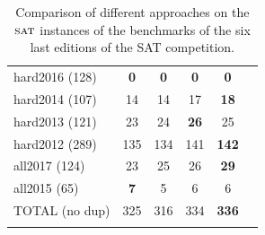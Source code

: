 \begin{table}[!htbp]
{{\begin{tabular}{l|ccccc}
    hard2016 (128) & \cellcolor{gray!30}\textbf{0} & \cellcolor{gray!30}\textbf{0} & \cellcolor{gray!30}\textbf{0} & \cellcolor{gray!30}\textbf{0}\\
    hard2014 (107) & 14 & 14 & 17 & \cellcolor{gray!30}\textbf{18}\\
    hard2013 (121) & 23 & 24 & \cellcolor{gray!30}\textbf{26} & 25\\
    hard2012 (289) & 135 & 134 & 141 & \cellcolor{gray!30}\textbf{142}\\
    \hline
    all2017 (124) & 23 & 25 & 26 & \cellcolor{gray!30}\textbf{29}\\
    all2015 (65) & \cellcolor{gray!30}\textbf{7} & 5 & 6 & 6\\
    \hline
    TOTAL (no dup) & 325 & 316 & 334 & \cellcolor{gray!30}\textbf{336}\\
    \label{table:sat:bliss}
   \end{tabular}
  }
 }
 \vspace*{0.1cm}
 \caption{Comparison of different approaches on the $\textsc{sat}$ instances of the benchmarks of the six last editions of the SAT competition.}
 \label{table:benchSAT}
\end{table}
\begin{table}[!htbp]
 \centering\footnotesize
 \hspace{1em}
 \vspace*{0.1cm}
 \caption{Comparison of PAR-2 times (in seconds) of the benchmarks on the six last editions of the SAT competition.}
 \label{tab:par2}
\end{table}


